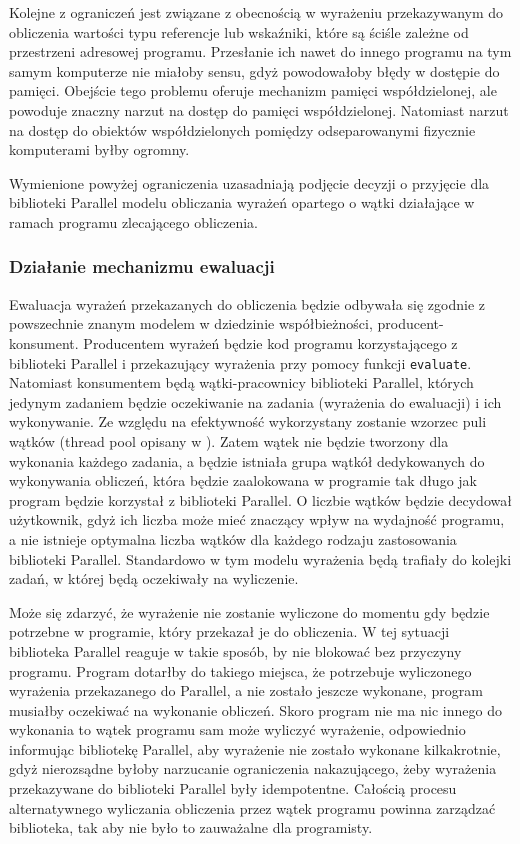   Kolejne z ograniczeń jest związane z obecnością w wyrażeniu przekazywanym do obliczenia wartości typu referencje lub wskaźniki, które są ściśle zależne od przestrzeni adresowej programu. 
  Przesłanie ich nawet do innego programu na tym samym komputerze nie miałoby sensu, gdyż powodowałoby błędy w dostępie do pamięci.
  Obejście tego problemu oferuje mechanizm pamięci współdzielonej, ale powoduje znaczny narzut na dostęp do pamięci współdzielonej.
  Natomiast narzut na dostęp do obiektów współdzielonych pomiędzy odseparowanymi fizycznie komputerami byłby ogromny.
  
  Wymienione powyżej ograniczenia uzasadniają podjęcie decyzji o przyjęcie dla biblioteki Parallel modelu obliczania wyrażeń opartego o wątki działające w ramach programu zlecającego obliczenia.
  
\subsubsection{Działanie mechanizmu ewaluacji}
  
  Ewaluacja wyrażeń przekazanych do obliczenia będzie odbywała się zgodnie z powszechnie znanym modelem w dziedzinie współbieżności, producent-konsument.
  Producentem wyrażeń będzie kod programu korzystającego z biblioteki Parallel i przekazujący wyrażenia przy pomocy funkcji \texttt{evaluate}.
  Natomiast konsumentem będą wątki-pracownicy biblioteki Parallel, których jedynym zadaniem będzie oczekiwanie na zadania (wyrażenia do ewaluacji) i ich wykonywanie.
  Ze względu na efektywność wykorzystany zostanie wzorzec puli wątków (thread pool opisany w \cite{threadpool}).
  Zatem wątek nie będzie tworzony dla wykonania każdego zadania, a będzie istniała grupa wątkół dedykowanych do wykonywania obliczeń, która będzie zaalokowana w programie tak długo jak program będzie korzystał z biblioteki Parallel.
  O liczbie wątków będzie decydował użytkownik, gdyż ich liczba może mieć znaczący wpływ na wydajność programu, a nie istnieje optymalna liczba wątków dla każdego rodzaju zastosowania biblioteki Parallel.
  Standardowo w tym modelu wyrażenia będą trafiały do kolejki zadań, w której będą oczekiwały na wyliczenie.
  
  Może się zdarzyć, że wyrażenie nie zostanie wyliczone do momentu gdy będzie potrzebne w programie, który przekazał je do obliczenia.
  W tej sytuacji biblioteka Parallel reaguje w takie sposób, by nie blokować bez przyczyny programu.
  Program dotarłby do takiego miejsca, że potrzebuje wyliczonego wyrażenia przekazanego do Parallel, a nie zostało jeszcze wykonane, program musiałby oczekiwać na wykonanie obliczeń.
  Skoro program nie ma nic innego do wykonania to wątek programu sam może wyliczyć wyrażenie, odpowiednio informując bibliotekę Parallel, aby wyrażenie nie zostało wykonane kilkakrotnie, 
  gdyż nierozsądne byłoby narzucanie ograniczenia nakazującego, żeby wyrażenia przekazywane do biblioteki Parallel były idempotentne.
  Całością procesu alternatywnego wyliczania obliczenia przez wątek programu powinna zarządzać biblioteka, tak aby nie było to zauważalne dla programisty.
  
